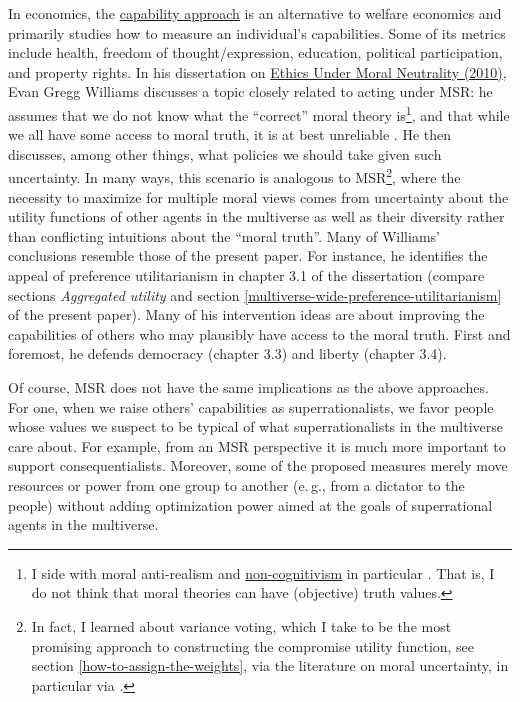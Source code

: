 In economics, the
\href{https://en.wikipedia.org/wiki/Capability_approach}{capability
approach} is an alternative to welfare economics and primarily studies
how to measure an individual's capabilities. Some of its metrics include
health, freedom of thought/expression, education, political
participation, and property rights. In his dissertation on
\href{https://rucore.libraries.rutgers.edu/rutgers-lib/34078/pdf/1/}{Ethics
Under Moral Neutrality (2010)}, Evan
Gregg Williams discusses a topic closely related to acting
under MSR: he assumes that we do not know what the ``correct'' moral
theory is\footnote{\label{non-cognitivism} I side with moral anti-realism
  \parencite{Joyce2016-no} and
  \href{https://en.wikipedia.org/wiki/Non-cognitivism}{non-cognitivism}
  in particular \parencite[section 3]{Joyce2016-no}. That is, I do not
  think that moral theories can have (objective) truth values.}, and
that while we all have some access to moral truth, it is at best
unreliable \parencite{Williams2011-ul}. He then discusses,
among other things, what policies we should take given such uncertainty.
In many ways, this scenario is analogous to MSR\footnote{In fact, I
  learned about variance voting, which I take to be the most promising
  approach to constructing the compromise utility function, see section
  \ref{how-to-assign-the-weights}, via the literature on moral uncertainty, in
  particular via \citet[chapter 3]{MacAskill2014-ca}.}, where the
necessity to maximize for multiple moral views comes from uncertainty
about the utility functions of other agents in the multiverse as well as
their diversity rather than conflicting intuitions about the ``moral
truth''. Many of Williams' conclusions resemble those of the present
paper. For instance, he identifies the appeal of preference
utilitarianism in chapter 3.1 of the dissertation (compare sections \emph{Aggregated utility} and
section \ref{multiverse-wide-preference-utilitarianism} of the present paper). 
Many of his
intervention ideas are about improving the capabilities of others who
may plausibly have access to the moral truth. First and foremost, he
defends democracy (chapter 3.3) and liberty (chapter 3.4).

Of course, MSR does not have the same implications as the above
approaches. For one, when we raise others' capabilities as
superrationalists, we favor people whose values we suspect to be typical
of what superrationalists in the multiverse care about. For example,
from an MSR perspective it is much more important to support
consequentialists. Moreover, some of the proposed measures merely move
resources or power from one group to another (e.\,g., from a dictator to
the people) without adding optimization power aimed at the goals of
superrational agents in the multiverse.

